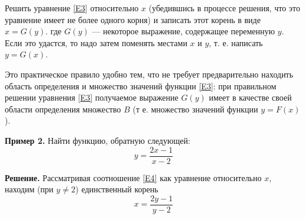 \documentclass{article}
\begin{document}
\par Решить уравнение \eqref{E3} относительно $x$ (убедившись в процессе решения, что это уравнение имеет не более одного корня) и записать этот корень в виде $x=G(y)$. где $G(y)$ — некоторое выражение, содержащее переменную $y$. Если это удастся, то надо затем поменять местами $x$ и $y$, т. е. написать $y=G(x)$.
\par Это практическое правило удобно тем, что не требует предварительно находить область определения и множество значений функции \eqref{E3}: при правильном решении уравнения \eqref{E3} получаемое выражение $G(y)$ имеет в качестве своей области определения множество $B$ (т е. множество значений функции $y=F(x)$).
\par\textbf{Пример 2.} Найти функцию, обратную следующей:
\begin{equation}\label{E4}
y=\frac{2x-1}{x-2}
\end{equation}
\par\textbf{Решение.} Рассматривая соотношение \eqref{E4} как уравнение относительно $x$, находим (при $y\ne 2$) единственный корень
$$x=\frac{2y-1}{y-2}$$
\end{document}
